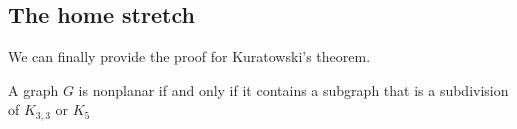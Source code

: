 \documentclass{article}
\begin{document}
\subsection{The home stretch}
We can finally provide the proof for Kuratowski's theorem.

\begin{theorem}
	A graph $G$ is nonplanar if and only if it contains a subgraph that is a subdivision of $K_{3,3}$ or $K_5$
\end{theorem}



\end{document}
